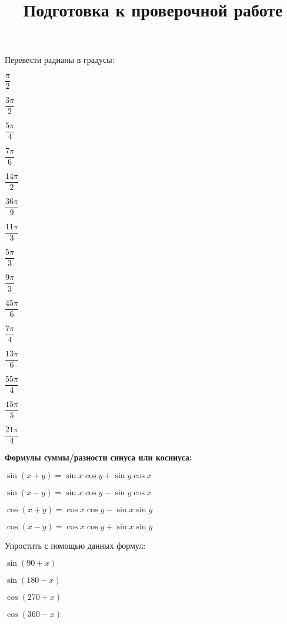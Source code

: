 %	
%
%
\newpage
\title{Подготовка к проверочной работе}
\begin{listofex}
	\item Перевести радианы в градусы:
	\begin{enumcols}[itemcolumns=5]
		\item \( \dfrac{\pi}{2} \)
		\item \( \dfrac{3\pi}{2} \)
		\item \( \dfrac{5\pi}{4} \)
		\item \( \dfrac{7\pi}{6} \)
		\item \( \dfrac{14\pi}{2} \)
		\item \( \dfrac{36\pi}{9} \)
		\item \( \dfrac{11\pi}{3} \)
		\item \( \dfrac{5\pi}{3} \)
		\item \( \dfrac{9\pi}{3} \)
		\item \( \dfrac{45\pi}{6} \)
		\item \( \dfrac{7\pi}{4} \)
		\item \( \dfrac{13\pi}{6} \)
		\item \( \dfrac{55\pi}{4} \)
		\item \( \dfrac{15\pi}{5} \)
		\item \( \dfrac{21\pi}{4} \)
	\end{enumcols}
	\item \textbf{Формулы суммы/разности синуса или косинуса:}
	\begin{enumcols}[itemcolumns=2]
		\item \( \sin(x+y)=\sin x\cos y + \sin y \cos x \)
		\item \( \sin(x-y)=\sin x\cos y - \sin y \cos x \)
		\item \( \cos(x+y)=\cos x \cos y - \sin x \sin y \)
		\item \( \cos(x-y)=\cos x \cos y + \sin x \sin y \)
	\end{enumcols}
	\item Упростить с помощью данных формул:
	\begin{enumcols}[itemcolumns=4]
		\item \( \sin(90+x)\)
		\item \( \sin(180-x)\)
		\item \( \cos(270+x)\)
		\item \( \cos(360-x)\)
	\end{enumcols}

\end{listofex}
